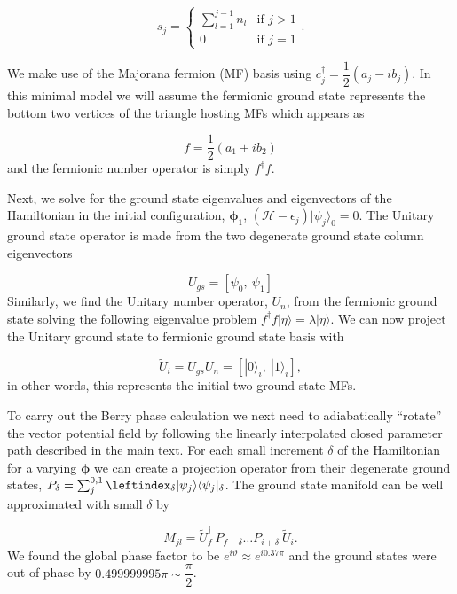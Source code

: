 \documentclass[aps,prb,showpacs,amsmath,amssymb,superscriptaddress]{revtex4-2}
\newcommand{\ham}{\mathcal{H}}
\newcommand{\cc}{c^{\dagger}}
\begin{document}
\begin{equation}
  s_j =
  \begin{cases}
    \sum_{l=1}^{j-1} n_l & \text{if $j>1$} \\
    0 & \text{if $j = 1$}
  \end{cases}
  .
\end{equation}

We make use of the Majorana fermion (MF) basis using $\cc_j = \dfrac{1}{2} (a_j - i b_j)$.
In this minimal model we will assume the fermionic ground state represents the bottom two vertices of the triangle hosting MFs which appears as

\begin{equation}
  f = \dfrac{1}{2} ( a_1 + i b_2 )
\end{equation}
and the fermionic number operator is simply $f^{\dagger} f$.

Next, we solve for the ground state eigenvalues and eigenvectors of the Hamiltonian in the initial configuration, $\bm \phi_1$, $(\ham-\epsilon_j)|\psi_j\rangle_0=0$.
The Unitary ground state operator is made from the two degenerate ground state column eigenvectors

\begin{equation}
  U_{gs} = [\psi_0,\  \psi_1]
  \end{equation}
Similarly, we find the Unitary number operator, $U_n$, from the fermionic ground state solving the following eigenvalue problem $f^{\dagger}f|\eta\rangle = \lambda|\eta\rangle$.
We can now project the Unitary ground state to fermionic ground state basis with

\begin{equation}
  \tilde{U}_i = U_{gs} U_{n} = [ |0\rangle_i,\  |1\rangle_i],
\end{equation}
in other words, this represents the initial two ground state MFs.

To carry out the Berry phase calculation we next need to adiabatically ``rotate'' the vector potential field by following the linearly interpolated closed parameter path described in the main text.
For each small increment $\delta$ of the Hamiltonian for a varying $\bm \phi$ we can create a projection operator from their degenerate ground states, $P_{\delta} = \sum_j^{0,1} \leftindex_{\delta}|\psi_j\rangle \langle \psi_j |_{\delta}$.
The ground state manifold can be well approximated with small $\delta$ by

\begin{equation}
  M_{jl} = \tilde{U}_f^{\dagger}\  P_{f-\delta} \dots P_{i+\delta}\  \tilde{U}_i.
\end{equation}
We found the global phase factor to be $e^{i\vartheta} \approx e^{i0.37\pi}$ and the ground states were out of phase by $0.499999995\pi \sim \dfrac{\pi}{2}$.
\end{document}
